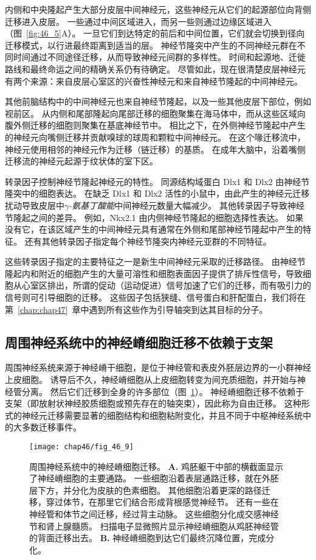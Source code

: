 内侧和中央隆起产生大部分皮层中间神经元，这些神经元从它们的起源部位向背侧迁移进入皮层。
一些通过中间区域进入，而另一些则通过边缘区域进入（图~\ref{fig:46_5}A）。
一旦它们到达特定的前后和中间位置，它们就会切换到径向迁移模式，以行进最终距离到适当的层。
神经节隆突中产生的不同神经元群在不同时间通过不同途径迁移，从而导致神经元间群的多样性。
时间和起源地、迁徙路线和最终命运之间的精确关系仍有待确定。
尽管如此，现在很清楚皮层神经元有两个来源：来自皮层心室区的兴奋性神经元和来自神经节隆起的中间神经元。


其他前脑结构中的中间神经元也来自神经节隆起，以及一些其他皮层下部位，例如视前区。
从内侧和尾部隆起向尾部迁移的细胞聚集在海马体中，而从这些区域向腹外侧迁移的细胞则聚集在基底神经节中。 
相比之下，在外侧神经节隆起中产生的神经元向嘴侧迁移并贡献嗅球的球周和颗粒中间神经元。
在这个喙迁移流中，神经元使用相邻的神经元作为迁移（链迁移）的基质。
在成年大脑中，沿着嘴侧迁移流的神经元起源于纹状体的室下区。


转录因子控制神经节隆起神经元的特性。
同源结构域蛋白 Dlx1 和 Dlx2 由神经节隆突中的细胞表达。
在缺乏 Dlx1 和 Dlx2 活性的小鼠中，由此产生的神经元迁移扰动导致皮层中\textit{$\gamma$-氨基丁酸能}中间神经元数量大幅减少。
其他转录因子导致神经节隆起之间的差异。
例如，Nkx2.1 由内侧神经节隆起的细胞选择性表达。
如果没有它，在该区域产生的中间神经元具有通常在外侧和尾部神经节隆起中产生的特征。
还有其他转录因子指定每个神经节隆突内神经元亚群的不同特征。


这些转录因子指定的主要特征之一是新生中间神经元采取的迁移路径。
由神经节隆起内和附近的细胞产生的大量可溶性和细胞表面因子提供了排斥性信号，导致细胞从心室区排出，所谓的促动（运动促进）信号加速了它们的迁移，而有吸引力的信号则可引导细胞的迁移。
这些因子包括狭缝、信号蛋白和肝配蛋白，我们将在第~\ref{chap:chap47}~章中遇到所有这些作为引导轴突到达其目标的分子。



\subsection{周围神经系统中的神经嵴细胞迁移不依赖于支架}

周围神经系统来源于神经嵴干细胞，是位于神经管和表皮外胚层边界的一小群神经上皮细胞。
诱导后不久，神经嵴细胞从上皮细胞转变为间充质细胞，并开始与神经管分离。
然后它们迁移到全身的许多部位（图~\ref{fig:46_9}）。
神经嵴细胞迁移不依赖于支架（即放射状神经胶质细胞或预先存在的轴突束），因此称为自由迁移。
这种形式的神经元迁移需要显著的细胞结构和细胞粘附变化，并且不同于中枢神经系统中的大多数迁移事件。


\begin{figure}[htbp]
	\centering
	\texttt{[image: chap46/fig\_46\_9]}
	\caption{周围神经系统中的神经嵴细胞迁移。
		\textbf{A.} 鸡胚躯干中部的横截面显示了神经嵴细胞的主要通路。
		一些细胞沿着表层通路迁移，就在外胚层下方，并分化为皮肤的色素细胞。
		其他细胞沿着更深的路径迁移，穿过体节，在那里它们结合形成背根感觉神经节。
		还有一些在神经管和体节之间迁移，经过背主动脉。
		这些细胞分化成交感神经节和肾上腺髓质。
		扫描电子显微照片显示神经嵴细胞从鸡胚神经管的背面迁移出去。
		\textbf{B.} 神经嵴细胞到达它们最终沉降位置，完成分化。}
	\label{fig:46_9}
\end{figure}


